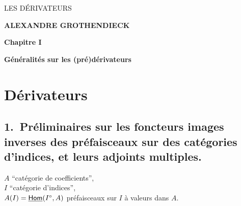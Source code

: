 \dgrchunkbegin

\printedpage{--} %

\begin{center}
{\Large\textsf{LES DÉRIVATEURS}}

\bigskip

\textbf{ALEXANDRE GROTHENDIECK}

\bigskip\bigskip

\textbf{Chapitre I}

\medskip

\textbf{Généralités sur les (pré)dérivateurs}
\end{center}

\vfill



\clearpage

\printedpage{--} %


\clearpage



\section*{Dérivateurs}

\subsection*{\textmd{1.}\ Préliminaires sur les foncteurs images inverses des préfaisceaux sur des catégories d'indices, et leurs adjoints multiples.}

$A$ “catégorie de coefficients”,\\
$I$ “catégorie d'indices”,\\
$A(I)=\underline{\mathsf{Hom}}(I^{\circ},A)$ préfaisceaux sur $I$ à valeurs dans $A$.

